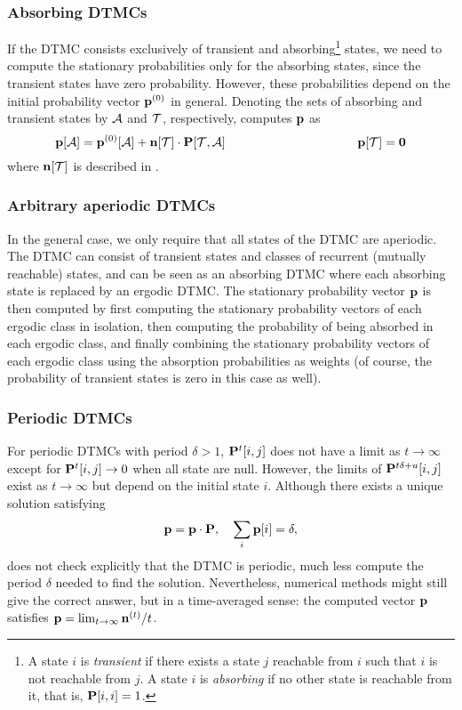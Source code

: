 \subsubsection{Absorbing DTMCs}

If the DTMC consists exclusively of transient and absorbing\footnote{
A state $i$ is \emph{transient} if there exists a state $j$ reachable from $i$
such that $i$ is not reachable from $j$.
A state $i$ is \emph{absorbing} if no other state is reachable from it,
that is, $\P[i,i] = 1$.
} states, we need to compute the
stationary probabilities only
for the absorbing states, since the transient states have zero probability.
However, these probabilities depend on the initial probability vector
$\vp^{(0)}$ in general.
Denoting the sets of absorbing and transient states by
$\aset$ and $\tset$, respectively, {\smart} computes $\vp$ as
\[
 \vp[\Set{A}] = \vp^{(0)}[\Set{A}] + \vn[\Set{T}] \cdot
 \P[\Set{T}, \Set{A}]
 ~~~~~~~~~~~~~~~~~~~~~~~~~~~~~~~~ \vp[\Set{T}] = \0
\]
where $\vn[\Set{T}]$ is described in .


\subsubsection{Arbitrary aperiodic DTMCs}

In the general case, we only require that all states of the DTMC are
aperiodic.
The DTMC can consist of transient states and classes of
recurrent (mutually reachable) states, and can be seen as an
absorbing DTMC where
each absorbing state is replaced by an ergodic DTMC.
The stationary probability vector $\vp$
is then computed by first computing the stationary probability vectors of each
ergodic class in isolation,
then computing the probability of being absorbed in each ergodic class, and
finally combining the stationary probability vectors of each ergodic class
using the absorption probabilities as weights (of course, the probability
of transient states is zero in this case as well).

\subsubsection{Periodic DTMCs}

For periodic DTMCs with period $\delta > 1$, $\P^t[i, j]$ does not
have a limit as $t\to\infty$ except for $\P^t[i, j]\to 0$ when all
state are null.  However, the limits of $\P^{t\delta+u}[i, j]$
exist as $t\to\infty$ but depend on the initial state $i$.
Although there exists a unique solution satisfying $$\vp = \vp
\cdot \P,\quad \sum_{i}\vp[i]=\delta,$$ {\smart} does not check
explicitly that the DTMC is periodic, much less compute the
period $\delta$ needed to find the solution. Nevertheless,
numerical methods might still give the correct answer, but in a
time-averaged sense: the computed vector $\vp$ satisfies $\vp =
\lim_{t \to\infty} \vn^{(t)}/t$.

